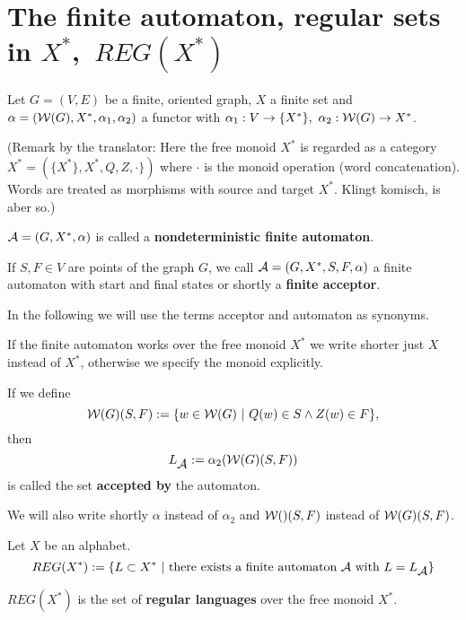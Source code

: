 \section{The finite automaton, regular sets in $X^*$,\ $REG(X^*)$}

Let $G = (V, E)$ be a finite, oriented graph, $X$ a finite set and $\alpha =
(\mbox{$\mathcal{W}(G)$}, X^*,\alpha_1, \alpha_2)$ a functor with $\alpha_1 : V \to \{ X^*
\},\ \alpha_2 : \mbox{$\mathcal{W}(G)$} \to X^*$.

(Remark by the translator: Here the free monoid $X^*$ is regarded as a category
$X^* = (\{X^*\}, X^*, Q, Z, \cdot \})$ where $\cdot$ is the monoid operation
(word concatenation). Words are treated as morphisms with source and target
$X^*$. Klingt komisch, is aber so.)

\begin{definition}
$\mbox{$\mathcal{A}$} = (G, X^*, \alpha)$ is called a {\bf nondeterministic finite
automaton}.
\end{definition}

If $S, F \in V$ are points of the graph $G$, we call $\mbox{$\mathcal{A}$} = (G, X^*,
S, F, \alpha)$ a finite automaton with start and final states or shortly a {\bf
finite acceptor}.

In the following we will use the terms acceptor and automaton as synonyms.

If the finite automaton works over the free monoid $X^*$ we write shorter just
$X$ instead of $X^*$, otherwise we specify the monoid explicitly.

\begin{definition}
If we define 
\[ \mbox{$\mathcal{W}(G)$}(S, F) := \{ w \in \mbox{$\mathcal{W}(G)$}\ |\ Q(w) \in S \wedge Z(w)
\in F \}, \]
then \[ L_{\mbox{$\mathcal{A}$}} := \alpha_2(\mbox{$\mathcal{W}(G)$}(S, F)) \] 
is called the set {\bf accepted by} the automaton. 
\end{definition}

We will also write shortly $\alpha$ instead of $\alpha_2$ and $\mbox{$\mathcal{W}()$}(S,F)$
instead of $\mbox{$\mathcal{W}(G)$}(S,F)$.

\begin{definition}
Let $X$ be an alphabet. \[ REG(X^*) := \{ L \subset X^*\ | \mbox{ there
exists a finite automaton } \mbox{$\mathcal{A}$} \mbox{ with } L = \mbox{$L_{\mbox{$\mathcal{A}$}}$} \}
\]

$REG(X^*)$ is the set of {\bf regular languages} over the free monoid $X^*$.
\end{definition}

